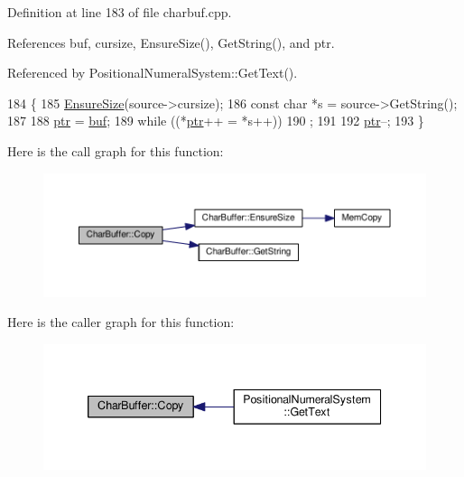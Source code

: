 Definition at line 183 of file charbuf.\+cpp.



References buf, cursize, Ensure\+Size(), Get\+String(), and ptr.



Referenced by Positional\+Numeral\+System\+::\+Get\+Text().


\begin{DoxyCode}
184 \{
185     \hyperlink{classCharBuffer_ad1907009b5ad136692b989fa96bf2f7e}{EnsureSize}(source->cursize);
186     \textcolor{keyword}{const} \textcolor{keywordtype}{char} *s = source->GetString();
187 
188     \hyperlink{classCharBuffer_a2d313433650506fd6609e6947729dfb0}{ptr} = \hyperlink{classCharBuffer_a8bcd8491b24db4197b311eb361609674}{buf};
189     \textcolor{keywordflow}{while} ((*\hyperlink{classCharBuffer_a2d313433650506fd6609e6947729dfb0}{ptr}++ = *s++))
190         ;
191 
192     \hyperlink{classCharBuffer_a2d313433650506fd6609e6947729dfb0}{ptr}--;
193 \}
\end{DoxyCode}


Here is the call graph for this function\+:
\nopagebreak
\begin{figure}[H]
\begin{center}
\leavevmode
\includegraphics[width=350pt]{dc/d84/classCharBuffer_a9f35562a39a7785e73f09fbd9f6938bf_cgraph}
\end{center}
\end{figure}




Here is the caller graph for this function\+:
\nopagebreak
\begin{figure}[H]
\begin{center}
\leavevmode
\includegraphics[width=339pt]{dc/d84/classCharBuffer_a9f35562a39a7785e73f09fbd9f6938bf_icgraph}
\end{center}
\end{figure}


